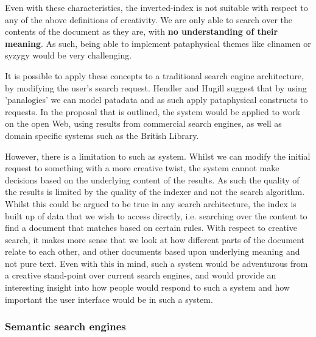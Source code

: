Even with these characteristics, the inverted-index is not suitable with respect to any of the above definitions of creativity. We are only able to search over the contents of the document as they are, with \textbf{no understanding of their meaning}. As such, being able to implement pataphysical themes like clinamen or syzygy would be very challenging.

It is possible to apply these concepts to a traditional search engine architecture, by modifying the user's search request. Hendler and Hugill \citep{Hendler2011} suggest that by using 'panalogies' we can model patadata and as such apply pataphysical constructs to requests. In the proposal that is outlined, the system would be applied to work on the open Web, using results from commercial search engines, as well as domain specific systems such as the British Library.

However, there is a limitation to such as system.  Whilst we can modify the initial request to something with a more creative twist, the system cannot make decisions based on the underlying content of the results. As such the quality of the results is limited by the quality of the indexer and not the search algorithm. Whilst this could be argued to be true in any search architecture, the index is built up of data that we wish to access directly, i.e. searching over the content to find a document that matches based on certain rules. With respect to creative search, it makes more sense that we look at how different parts of the document relate to each other, and other documents based upon underlying meaning and not pure text. Even with this in mind, such a system would be adventurous from a creative stand-point over current search engines, and would provide an interesting insight into how people would respond to such a system and how important the user interface would be in such a system.

\subsubsection{Semantic search engines}

